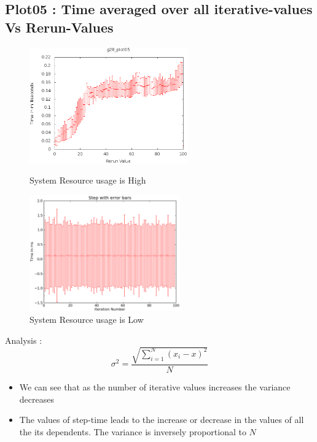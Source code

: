 \documentclass[a4paper,11pt]{article}
\begin{document}
\subsection{Plot05 : Time averaged over all iterative-values Vs Rerun-Values}
	\begin{figure}[ht]
	\begin{minipage}[ht]{0.5\linewidth}
	\includegraphics[height=50mm]{plots/g28_project_plot05.eps}
	\caption{System Resource usage is High }	
	\end{minipage}	
	\begin{minipage}[ht]{0.5\linewidth}
	\includegraphics[height=50mm]{plots1/g28_project_plot05.eps}
	\caption{System Resource usage is Low }		
	\end{minipage}	
	\end{figure}
	Analysis :
	\begin{equation}
	\sigma^2 = \frac{\sqrt{\sum_{i=1}^{N} (x_i -x)^2}}{N}
	\end{equation}
	\begin{itemize}
	\item We can see that as the number of iterative values increases the variance 
	decreases
	\item The values of step-time leads to the increase or decrease in the values of 
	all the its dependents. The variance is inversely proportional to $N$
	\end{itemize}
\end{document}
